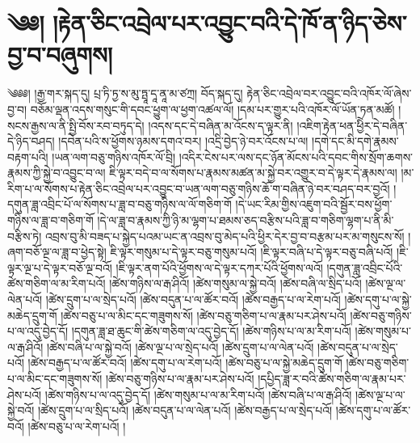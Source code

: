 \setcounter{footnote}{0} 
\chapter{༄༅། །རྟེན་ཅིང་འབྲེལ་པར་འབྱུང་བའི་དེ་ཁོ་ན་ཉིད་ཅེས་བྱ་བ་བཞུགས།}༄༅༅། །རྒྱ་གར་སྐད་དུ། པྲ་ཏི་ཏྱ་ས་མུ་ཏྤཱ་དཱ་ནཱ་མ་ཙཀྲ། བོད་སྐད་དུ། རྟེན་ཅིང་འབྲེལ་བར་འབྱུང་བའི་འཁོར་ལོ་ཞེས་བྱ་བ། བཅོམ་ལྡན་འདས་གསུང་གི་དབང་ཕྱུག་ལ་ཕྱག་འཚལ་ལོ། །དམ་པར་གྱུར་པའི་འཁོར་ལོ་ཡོན་ཏན་མཚོ། །སངས་རྒྱས་ལ་ནི་སྤྱི་བོས་རབ་བཏུད་དེ། །འདས་དང་དེ་བཞིན་མ་འོངས་ད་ལྟར་ནི། །འཇིག་རྟེན་ཕན་ཕྱིེར་དེ་བཞིན་དེ་ཉིད་བཤད། །དབེན་པའི་ས་ཕྱོགས་ཉམས་དགའ་བར། །འདྲི་བྱེད་ཉེ་བར་འོངས་པ་ལ། །དགེ་དང་མི་དགེ་རྣམས་བརྟག་པའི། །ཡན་ལག་བཅུ་གཉིས་འཁོར་ལོ་བྲི། །འདིར་ངེས་པར་ལས་དང་ཉོན་མོངས་པའི་དབང་གིས་སྲོག་ཆགས་རྣམས་ཀྱི་སྐྱེ་བ་འབྱུང་བ་ལ། ཇི་ལྟར་བདེ་བ་ལ་སོགས་པ་རྣམས་མཚན་མ་སྐྱེ་བར་འགྱུར་བ་དེ་ལྟར་དེ་རྣམས་ལ། །མ་རིག་པ་ལ་སོགས་པ་རྟེན་ཅིང་འབྲེལ་པར་འབྱུང་བ་ཡན་ལག་བཅུ་གཉིས་ཆོ་ག་བཞིན་ཉེ་བར་བཤད་བར་བྱའོ། །དགུན་ཟླ་འབྲིང་པོ་ལ་སོགས་པ་ཟླ་བ་བཅུ་གཉིས་ལ་ལོ་གཅིག་གོ །དེ་ཡང་རིམ་གྱིས་འཇུག་བའི་སྦྱོར་བས་ཕྱོག་གཉིས་ལ་ཟླ་བ་གཅིག་གོ །དེ་ལ་ཟླ་བ་རྣམས་ཀྱི་ཉི་མ་ལྷག་པ་ཐམས་ཅད་བརྩིས་པའི་ཟླ་བ་གཅིག་ལྷག་པ་ནི་མི་བརྩིས་ཏེ། འབྲས་བུ་མི་བཟད་པ་སྐྱེད་པའམ་ཡང་ན་འབྲས་བུ་མེད་པའི་ཕྱིར་དེར་བྱ་བ་བརྩམ་པར་མ་གསུངས་སོ། །ཞག་བཅོ་ལྔ་ལ་ཟླ་བ་ཕྱེད་སྟེ། ཇི་ལྟར་གསུམ་པ་དེ་ལྟར་བཅུ་གསུམ་པའོ། །ཇི་ལྟར་བཞི་པ་དེ་ལྟར་བཅུ་བཞི་པའོ། །ཇི་ལྟར་ལྔ་པ་དེ་ལྟར་བཅོ་ལྔ་བའོ། །ཇི་ལྟར་ནག་པོའི་ཕྱོགས་ལ་དེ་ལྟར་དཀར་པོའི་ཕྱོགས་ལའོ། །དགུན་ཟླ་འབྲིང་པོའི་ཚེས་གཅིག་ལ་མ་རིག་པའོ། །ཚེས་གཉིས་ལ་རྒ་ཤིའོ། །ཚེས་གསུམ་ལ་སྐྱེ་བའོ། །ཚེས་བཞི་ལ་སྲིད་པའོ། །ཚེས་ལྔ་ལ་ལེན་པའོ། །ཚེས་དྲུག་པ་ལ་སྲེད་པའོ། །ཚེས་བདུན་པ་ལ་ཚོར་བའོ། །ཚེས་བརྒྱད་པ་ལ་རེག་པའོ། །ཚེས་དགུ་པ་ལ་སྐྱེ་མཆེད་དྲུག་གོ །ཚེས་བཅུ་པ་ལ་མིང་དང་གཟུགས་སོ། །ཚེས་བཅུ་གཅིག་པ་ལ་རྣམ་པར་ཤེས་པའོ། །ཚེས་བཅུ་གཉིས་པ་ལ་འདུ་བྱེད་དོ། །དགུན་ཟླ་ཐ་ཆུང་གི་ཚེས་གཅིག་ལ་འདུ་བྱེད་དོ། །ཚེས་གཉིས་པ་ལ་མ་རིག་པའོ། །ཚེས་གསུམ་པ་ལ་རྒ་ཤིའོ། །ཚེས་བཞི་པ་ལ་སྐྱེ་བའོ། །ཚེས་ལྔ་པ་ལ་སྲེད་པའོ། །ཚེས་དྲུག་པ་ལ་ལེན་པའོ། །ཚེས་བདུན་པ་ལ་སྲེད་པའོ། །ཚེས་བརྒྱད་པ་ལ་ཚོར་བའོ། །ཚེས་དགུ་པ་ལ་རེག་པའོ། །ཚེས་བཅུ་པ་ལ་སྐྱེ་མཆེད་དྲུག་གོ །ཚེས་བཅུ་གཅིག་པ་ལ་མིང་དང་གཟུགས་སོ། །ཚེས་བཅུ་གཉིས་པ་ལ་རྣམ་པར་ཤེས་པའོ། །དཔྱིད་ཟླ་ར་བའི་ཚེས་གཅིག་ལ་རྣམ་པར་ཤེས་པའོ། །ཚེས་གཉིས་པ་ལ་འདུ་བྱེད་དོ། །ཚེས་གསུམ་པ་ལ་མ་རིག་པའོ། །ཚེས་བཞི་པ་ལ་རྒ་ཤིའོ། །ཚེས་ལྔ་པ་ལ་སྐྱེ་བའོ། །ཚེས་དྲུག་པ་ལ་སྲིད་པའོ། །ཚེས་བདུན་པ་ལ་ལེན་པའོ། །ཚེས་བརྒྱད་པ་ལ་སྲེད་པའོ། །ཚེས་དགུ་པ་ལ་ཚོར་བའོ། །ཚེས་བཅུ་པ་ལ་རེག་པའོ། །
